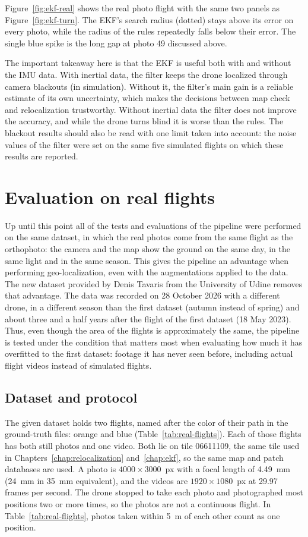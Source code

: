 \documentclass[english, Lau, oneside]{sapthesis}%
\begin{document}
Figure~\ref{fig:ekf-real} shows the real photo flight with the same two panels as Figure~\ref{fig:ekf-turn}. The EKF's search radius (dotted) stays above its error on every photo, while the radius of the rules repeatedly falls below their error. The single blue spike is the long gap at photo 49 discussed above.


The important takeaway here is that the EKF is useful both with and without the IMU data. With inertial data, the filter keeps the drone localized through camera blackouts (in simulation). Without it, the filter's main gain is a reliable estimate of its own uncertainty, which makes the decisions between map check and relocalization trustworthy. Without inertial data the filter does not improve the accuracy, and while the drone turns blind it is worse than the rules. The blackout results should also be read with one limit taken into account: the noise values of the filter were set on the same five simulated flights on which these results are reported.

\chapter{Evaluation on real flights}
\label{chap:evaluation}
Up until this point all of the tests and evaluations of the pipeline were performed on the same dataset, in which the real photos come from the same flight as the orthophoto: the camera and the map show the ground on the same day, in the same light and in the same season. This gives the pipeline an advantage when performing geo-localization, even with the augmentations applied to the data. The new dataset provided by Denis Tavaris from the University of Udine removes that advantage. The data was recorded on 28 October 2026 with a different drone, in a different season than the first dataset (autumn instead of spring) and about three and a half years after the flight of the first dataset (18 May 2023). Thus, even though the area of the flights is approximately the same, the pipeline is tested under the condition that matters most when evaluating how much it has overfitted to the first dataset: footage it has never seen before, including actual flight videos instead of simulated flights.

\section{Dataset and protocol}
\label{sec:real-protocol}
The given dataset holds two flights, named after the color of their path in the ground-truth files: orange and blue (Table~\ref{tab:real-flights}). Each of those flights has both still photos and one video. Both lie on tile 06611109, the same tile used in Chapters~\ref{chap:relocalization} and~\ref{chap:ekf}, so the same map and patch databases are used. A photo is $4000 \times 3000$~px with a focal length of 4.49~mm (24~mm in 35~mm equivalent), and the videos are $1920 \times 1080$~px at 29.97 frames per second. The drone stopped to take each photo and photographed most positions two or more times, so the photos are not a continuous flight. In Table~\ref{tab:real-flights}, photos taken within 5~m of each other count as one position.
\end{document}
